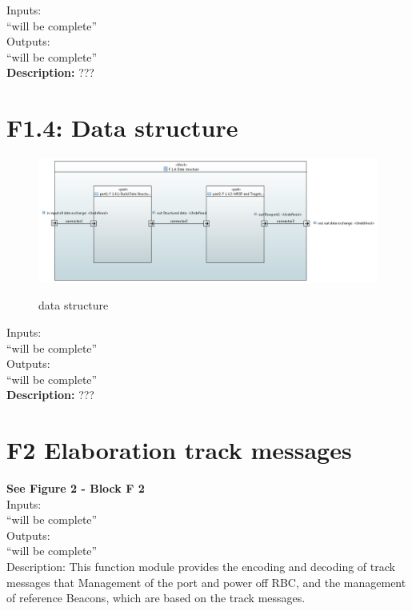 \documentclass{template/openetcs_report}
\begin{document}
  Inputs:\\
``will be complete''\\

 Outputs:\\
 ``will be complete''\\
 
 \textbf{ Description:} ???
 
 \newpage
 \section{F1.4: Data structure}
\begin{figure}[hbtp]
\centering
\includegraphics [scale=0.5] {images/data_structure}\\
\caption{data structure}
\end{figure}

  Inputs:\\
``will be complete''\\

 Outputs:\\
 ``will be complete''\\
 
 \textbf{ Description:} ???
 

 \section{F2 Elaboration track messages}
 
 \textbf{See Figure 2 - Block F 2}\\
 
  Inputs:\\
``will be complete''\\

 Outputs:\\
 ``will be complete''\\
 
 Description: This function module provides the encoding and decoding of track messages that 
Management of the port and power off RBC, and the management of reference 
Beacons, which are based on the track messages.\\
\end{document}
